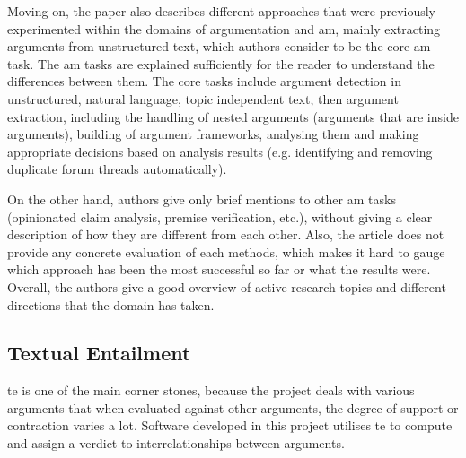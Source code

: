         Moving on, the paper also describes different approaches that were previously experimented within the domains of argumentation and \gls{am}, mainly extracting arguments from unstructured text, which authors consider to be the core \gls{am} task. The \gls{am} tasks are explained sufficiently for the reader to understand the differences between them. The core tasks include argument detection in unstructured, natural language, topic independent text, then argument extraction, including the handling of nested arguments (arguments that are inside arguments), building of argument frameworks, analysing them and making appropriate decisions based on analysis results (e.g. identifying and removing duplicate forum threads automatically). 
        
        On the other hand, authors give only brief mentions to other \gls{am} tasks (opinionated claim analysis, premise verification, etc.), without giving a clear description of how they are different from each other. Also, the article does not provide any concrete evaluation of each methods, which makes it hard to gauge which approach has been the most successful so far or what the results were. Overall, the authors give a good overview of active research topics and different directions that the domain has taken.
        
    \subsection{Textual Entailment} \label{textentail}
        \gls{te} is one of the main corner stones, because the project deals with various arguments that when evaluated against other arguments, the degree of support or contraction varies a lot. Software developed in this project utilises \gls{te} to compute and assign a verdict to interrelationships between arguments.
    
